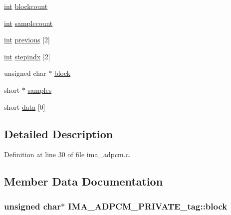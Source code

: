 \begin{DoxyCompactItemize}
\hyperlink{xmltok_8h_a5a0d4a5641ce434f1d23533f2b2e6653}{int} \hyperlink{struct_i_m_a___a_d_p_c_m___p_r_i_v_a_t_e__tag_a8dab6fe62ac65e63c018d708c09f0844}{blockcount}
\item 
\hyperlink{xmltok_8h_a5a0d4a5641ce434f1d23533f2b2e6653}{int} \hyperlink{struct_i_m_a___a_d_p_c_m___p_r_i_v_a_t_e__tag_a91763cb2d4033c93738e1147ed4e451e}{samplecount}
\item 
\hyperlink{xmltok_8h_a5a0d4a5641ce434f1d23533f2b2e6653}{int} \hyperlink{struct_i_m_a___a_d_p_c_m___p_r_i_v_a_t_e__tag_a9b1152f7509c837b325f9f21540294f8}{previous} \mbox{[}2\mbox{]}
\item 
\hyperlink{xmltok_8h_a5a0d4a5641ce434f1d23533f2b2e6653}{int} \hyperlink{struct_i_m_a___a_d_p_c_m___p_r_i_v_a_t_e__tag_a33b9763853eb306e7c361e75540482ae}{stepindx} \mbox{[}2\mbox{]}
\item 
unsigned char $\ast$ \hyperlink{struct_i_m_a___a_d_p_c_m___p_r_i_v_a_t_e__tag_aedcf368c42a966263e18f937b85d2114}{block}
\item 
short $\ast$ \hyperlink{struct_i_m_a___a_d_p_c_m___p_r_i_v_a_t_e__tag_ac0a801bf7a6f65a510fda0372238da19}{samples}
\item 
short \hyperlink{struct_i_m_a___a_d_p_c_m___p_r_i_v_a_t_e__tag_a66fa20e545758fe34ed1bc881ec8fbaa}{data} \mbox{[}0\mbox{]}
\end{DoxyCompactItemize}


\subsection{Detailed Description}


Definition at line 30 of file ima\+\_\+adpcm.\+c.



\subsection{Member Data Documentation}
\subsubsection[{\texorpdfstring{block}{block}}]{\setlength{\rightskip}{0pt plus 5cm}unsigned char$\ast$ I\+M\+A\+\_\+\+A\+D\+P\+C\+M\+\_\+\+P\+R\+I\+V\+A\+T\+E\+\_\+tag\+::block}\hypertarget{struct_i_m_a___a_d_p_c_m___p_r_i_v_a_t_e__tag_aedcf368c42a966263e18f937b85d2114}{}\label{struct_i_m_a___a_d_p_c_m___p_r_i_v_a_t_e__tag_aedcf368c42a966263e18f937b85d2114}


